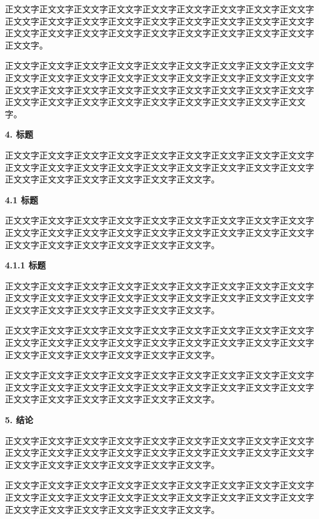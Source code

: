 \documentclass[
]{article}
\begin{document}
正文文字正文文字正文文字正文文字正文文字正文文字正文文字正文文字正文文字正文文字正文文字正文文字正文文字正文文字正文文字正文文字正文文字正文文字正文文字正文文字正文文字正文文字正文文字正文文字正文文字正文文字正文文字正文文字。

正文文字正文文字正文文字正文文字正文文字正文文字正文文字正文文字正文文字正文文字正文文字正文文字正文文字正文文字正文文字正文文字正文文字正文文字正文文字正文文字正文文字正文文字正文文字正文文字正文文字正文文字正文文字正文文字正文文字正文文字正文文字正文文字正文文字正文文字正文文字正文文字。

\textbf{\hfill\break
}\protect{}\label{_Toc4937}{}\textbf{4. 标题}

正文文字正文文字正文文字正文文字正文文字正文文字正文文字正文文字正文文字正文文字正文文字正文文字正文文字正文文字正文文字正文文字正文文字正文文字正文文字正文文字正文文字正文文字正文文字正文文字。

\protect{}\label{_Toc22371}{}\textbf{4.1 标题}

正文文字正文文字正文文字正文文字正文文字正文文字正文文字正文文字正文文字正文文字正文文字正文文字正文文字正文文字正文文字正文文字正文文字正文文字正文文字正文文字正文文字正文文字正文文字正文文字。

\protect{}\label{_Toc27652}{}\textbf{4.1.1 标题}

正文文字正文文字正文文字正文文字正文文字正文文字正文文字正文文字正文文字正文文字正文文字正文文字正文文字正文文字正文文字正文文字正文文字正文文字正文文字正文文字正文文字正文文字正文文字正文文字。

正文文字正文文字正文文字正文文字正文文字正文文字正文文字正文文字正文文字正文文字正文文字正文文字正文文字正文文字正文文字正文文字正文文字正文文字正文文字正文文字正文文字正文文字正文文字正文文字。

正文文字正文文字正文文字正文文字正文文字正文文字正文文字正文文字正文文字正文文字正文文字正文文字正文文字正文文字正文文字正文文字正文文字正文文字正文文字正文文字正文文字正文文字正文文字正文文字。

\textbf{\hfill\break
}\protect{}\label{_Toc4867}{}\textbf{5. 结论}

正文文字正文文字正文文字正文文字正文文字正文文字正文文字正文文字正文文字正文文字正文文字正文文字正文文字正文文字正文文字正文文字正文文字正文文字正文文字正文文字正文文字正文文字正文文字正文文字。

正文文字正文文字正文文字正文文字正文文字正文文字正文文字正文文字正文文字正文文字正文文字正文文字正文文字正文文字正文文字正文文字正文文字正文文字正文文字正文文字正文文字正文文字正文文字正文文字。
\end{document}

